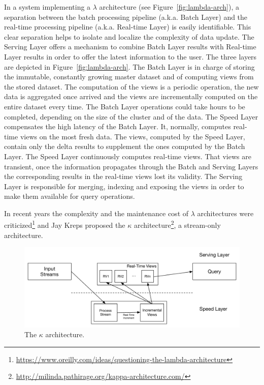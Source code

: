 In a system implementing a $\lambda$ architecture (see Figure~\ref{fig:lambda-arch}), a separation between the batch processing pipeline (a.k.a. Batch Layer) and the real-time processing pipeline (a.k.a. Real-time Layer) is easily identifiable. This clear separation helps to isolate and localize the complexity of data update. The Serving Layer offers a mechanism to combine Batch Layer results with Real-time Layer results in order to offer the latest information to the user. The three layers are depicted in Figure~\ref{fig:lambda-arch}.
The Batch Layer is in charge of storing the immutable, constantly growing master dataset and of computing views from the stored dataset. 
The computation of the views is a periodic operation, the new data is aggregated once arrived and the views are incrementally computed on the entire dataset every time.
The Batch Layer operations could take hours to be completed, depending on the size of the cluster and of the data.
The Speed Layer compensates the high latency of the Batch Layer. It, normally, computes real-time views on the most fresh data. The views, computed by the Speed Layer, contain only the delta results to supplement the ones computed by the Batch Layer.
The Speed Layer continuously computes real-time views. That views are transient, once the information propagates through the Batch and Serving Layers the corresponding results in the real-time views lost its validity.
The Serving Layer is responsible for merging, indexing and exposing the views in order to make them available for query operations.

In recent years the complexity and the maintenance cost of $\lambda$ architectures were criticized\footnote{\url{https://www.oreilly.com/ideas/questioning-the-lambda-architecture}} and Jay Kreps proposed the $\kappa$ architecture\footnote{\url{http://milinda.pathirage.org/kappa-architecture.com/}}, a stream-only architecture.

\begin{figure}[t]
  \begin{center}
    \includegraphics[width=\textwidth]{img/kappa-arch}
    \caption{The $\kappa$ architecture.}
    \label{fig:kappa-arch}
  \end{center}
\end{figure}

